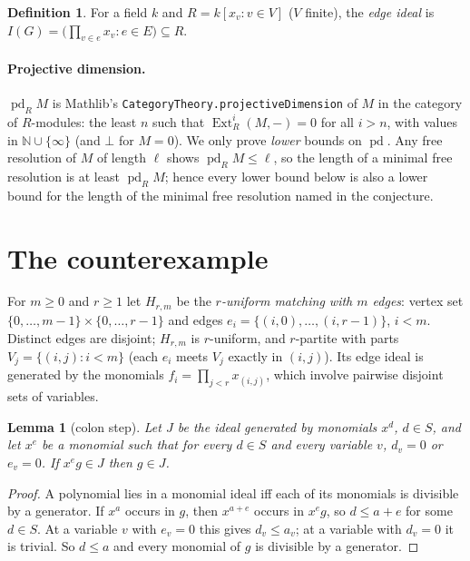 \documentclass[11pt]{article}
\newtheorem{lemma}[theorem]{Lemma}
\theoremstyle{definition}
\newtheorem{definition}[theorem]{Definition}
\theoremstyle{remark}
\renewcommand{\_}{\oldus\allowbreak}
\newcommand{\pd}{\operatorname{pd}}
\begin{document}
\begin{definition}
For a field $k$ and $R=k[x_v:v\in V]$ ($V$ finite), the \emph{edge ideal} is
$I(G)=\bigl(\prod_{v\in e}x_v : e\in E\bigr)\subseteq R$.
\end{definition}

\paragraph{Projective dimension.} $\pd_R M$ is Mathlib's
\texttt{CategoryTheory.projectiveDimension} of $M$ in the category of $R$-modules: the least $n$
such that $\operatorname{Ext}^{i}_R(M,-)=0$ for all $i>n$, with values in
$\mathbb{N}\cup\{\infty\}$ (and $\bot$ for $M=0$). We only prove \emph{lower} bounds on $\pd$.
Any free resolution of $M$ of length $\ell$ shows $\pd_R M\le\ell$, so the length of a minimal free
resolution is at least $\pd_R M$; hence every lower bound below is also a lower bound for the
length of the minimal free resolution named in the conjecture.

\section{The counterexample}

For $m\ge 0$ and $r\ge 1$ let $H_{r,m}$ be the \emph{$r$-uniform matching with $m$ edges}: vertex set
$\{0,\dots,m-1\}\times\{0,\dots,r-1\}$ and edges $e_i=\{(i,0),\dots,(i,r-1)\}$, $i<m$. Distinct
edges are disjoint; $H_{r,m}$ is $r$-uniform, and $r$-partite with parts $V_j=\{(i,j):i<m\}$ (each
$e_i$ meets $V_j$ exactly in $(i,j)$). Its edge ideal is generated by the monomials
$f_i=\prod_{j<r}x_{(i,j)}$, which involve pairwise disjoint sets of variables.

\begin{lemma}[colon step]\label{lem:colon}
Let $J$ be the ideal generated by monomials $x^{d}$, $d\in S$, and let $x^{e}$ be a monomial such
that for every $d\in S$ and every variable $v$, $d_v=0$ or $e_v=0$. If $x^{e}g\in J$ then $g\in J$.
\end{lemma}
\begin{proof}
A polynomial lies in a monomial ideal iff each of its monomials is divisible by a generator. If
$x^{a}$ occurs in $g$, then $x^{a+e}$ occurs in $x^e g$, so $d\le a+e$ for some $d\in S$. At a
variable $v$ with $e_v=0$ this gives $d_v\le a_v$; at a variable with $d_v=0$ it is trivial. So
$d\le a$ and every monomial of $g$ is divisible by a generator.
\end{proof}
\end{document}
